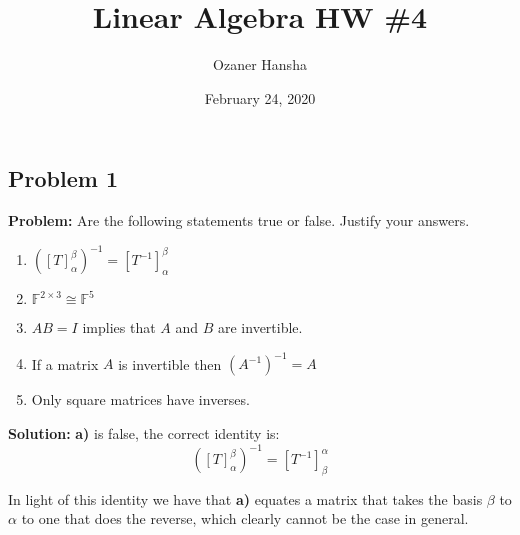 \documentclass{article}
\renewcommand\vec{\mathbf}
\begin{document}
\title{Linear Algebra HW \#4}
\author{Ozaner Hansha}
\date{February 24, 2020}
\maketitle

\subsection*{Problem 1}
\noindent\textbf{Problem:} Are the following statements true or false. Justify your answers.
\begin{enumerate}[label=\textbf{\alph*)}]
  \item $\left([T]^{\beta}_{\alpha}\right)^{-1}=[T^{-1}]^{\beta}_{\alpha}$
  \item $\mathbb F^{2\times 3}\cong\mathbb F^5$
  \item $AB=I$ implies that $A$ and $B$ are invertible.
  \item If a matrix $A$ is invertible then $(A^{-1})^{-1}=A$ 
  \item Only square matrices have inverses.
\end{enumerate}
\bigskip

\noindent\textbf{Solution:} \textbf{a)} is false, the correct identity is:
$$\left([T]^{\beta}_{\alpha}\right)^{-1}=[T^{-1}]_{\beta}^{\alpha}$$

In light of this identity we have that \textbf{a)} equates a matrix that takes the basis $\beta$ to $\alpha$ to one that does the reverse, which clearly cannot be the case in general.


\medskip
\end{document}
